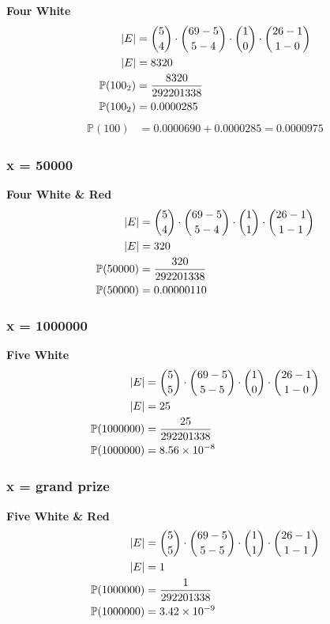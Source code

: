 \documentclass{article}
\begin{document}
\textbf{Four White}
\begin{align*}
	|E|               & = \binom{5}{4} \cdot \binom{69 - 5}{5 - 4} \cdot \binom{1}{0} \cdot \binom{26 - 1}{1 - 0}                \\
	|E|               & = 8320                       \\
	\mathbb{P}(100_2) & = \frac{ 8320 }{ 292201338 } \\
	\mathbb{P}(100_2) & = 0.0000285
\end{align*}
\begin{align*}
	\mathbb{P}(100) & = 0.0000690 + 0.0000285 = 0.0000975
\end{align*}

\subsubsection{x = 50000}

\textbf{Four White \& Red}
\begin{align*}
	|E|               & = \binom{5}{4} \cdot \binom{69 - 5}{5 - 4} \cdot \binom{1}{1} \cdot \binom{26 - 1}{1 - 1}               \\
	|E|               & = 320                       \\
	\mathbb{P}(50000) & = \frac{ 320 }{ 292201338 } \\
	\mathbb{P}(50000) & = 0.00000110
\end{align*}

\subsubsection{x = 1000000}

\textbf{Five White}
\begin{align*}
	|E|                 & = \binom{5}{5} \cdot \binom{69 - 5}{5 - 5} \cdot \binom{1}{0} \cdot \binom{26 - 1}{1 - 0}              \\
	|E|                 & = 25                       \\
	\mathbb{P}(1000000) & = \frac{ 25 }{ 292201338 } \\
	\mathbb{P}(1000000) & = \num{8.56e-8}
\end{align*}

\subsubsection{x = grand prize}

\textbf{Five White \& Red}
\begin{align*}
	|E|                 & = \binom{5}{5} \cdot \binom{69 - 5}{5 - 5} \cdot \binom{1}{1} \cdot \binom{26 - 1}{1 - 1}             \\
	|E|                 & = 1                       \\
	\mathbb{P}(1000000) & = \frac{ 1 }{ 292201338 } \\
	\mathbb{P}(1000000) & = \num{3.42e-9}
\end{align*}
\end{document}

